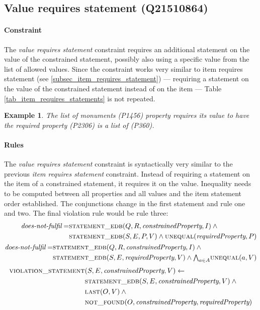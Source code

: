 \documentclass[hyperref,bachelorofscience,fleqn]{cgvpub}
\newtheorem{example}{Example}
\begin{document}
\subsection{Value requires statement (Q21510864)}\label{subsec_value_requires_statement}
\paragraph{Constraint}
The \emph{value requires statement} constraint requires an additional statement on the value of the constrained statement, possibly also using a specific value from the list of allowed values. Since the constraint works very similar to item requires statement (see \ref{subsec_item_requires_statement}) --- requiring a statement on the value of the constrained statement instead of on the item --- Table \ref{tab_item_requires_statements} is not repeated.

\begin{example}
The \emph{list of monuments} (P1456) property requires its value to have the \emph{required property} (P2306) \emph{is a list of} (P360).
\end{example}

\paragraph{Rules}
The \emph{value requires statement} constraint is syntactically very similar to the previous \emph{item requires statement} constraint. Instead of requiring a statement on the item of a constrained statement, it requires it on the value. Inequality needs to be computed between all properties and all values and the item statement order established. The conjunctions change in the first statement and rule one and two. The final violation rule would be rule three:
\begin{align}
\begin{split}
\emph{does-not-fulfil} = &\textsc{statement\_edb}(Q, R, \emph{constrainedProperty}, I) \wedge{} \\
&\textsc{statement\_edb}(S, E, P, V) \wedge \textsc{unequal}(\emph{requiredProperty}, P)
\end{split}\\
\begin{split}
\emph{does-not-fulfil} = &\textsc{statement\_edb}(Q, R, \emph{constrainedProperty}, I) \wedge{} \\
&\textsc{statement\_edb}(S, E, \emph{requiredProperty}, V) \wedge {\textstyle\bigwedge}_{a \in A} \textsc{unequal}(a, V)
\end{split}
\end{align}
\begin{align}
\begin{split}
\textsc{violation\_statement}&(S, E, \emph{constrainedProperty}, V) \leftarrow \\
&\textsc{statement\_edb}(S, E, \emph{constrainedProperty}, V) \wedge{} \\
&\textsc{last}(O, V) \wedge{} \\
&\textsc{not\_found}(O, \emph{constrainedProperty}, \emph{requiredProperty})
\end{split}
\end{align}
\end{document}
